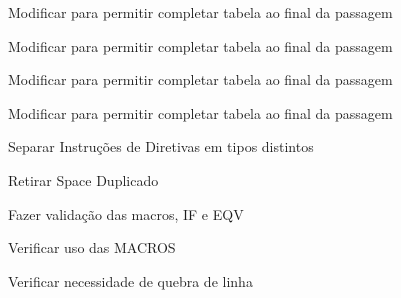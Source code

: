 
\begin{DoxyRefList}
\item[\label{todo__todo000001}%
\hypertarget{todo__todo000001}{}%
Membro \hyperlink{assembler_8cpp_a45dcd38a718d16b9fdcda1e45c4ad5de}{add\-New\-Symbol\-I\-N\-S\-T1} (string str\-Inst1, string str\-Arg1, int line\-Count, string line)]Modificar para permitir completar tabela ao final da passagem  
\item[\label{todo__todo000002}%
\hypertarget{todo__todo000002}{}%
Membro \hyperlink{assembler_8cpp_ad85cc701dcbc6e69b1c273a99c2262d8}{add\-New\-Symbol\-I\-N\-S\-T1\-P\-L\-U\-S} (string str\-Inst1, string str\-Arg1, int num\-Arg1\-Plus, int line\-Count, string line)]Modificar para permitir completar tabela ao final da passagem  
\item[\label{todo__todo000003}%
\hypertarget{todo__todo000003}{}%
Membro \hyperlink{assembler_8cpp_a4b08bb4206172aa8ae36e47f8298e274}{add\-New\-Symbol\-I\-N\-S\-T2} (string str\-Inst2, string str\-Arg1, string str\-Arg2, int line\-Count, string line)]Modificar para permitir completar tabela ao final da passagem 

Modificar para permitir completar tabela ao final da passagem  
\item[\label{todo__todo000005}%
\hypertarget{todo__todo000005}{}%
Membro \hyperlink{languagedefinition_8h_a1830ff5737e4f1610e975ee2aa489206}{Instruction\-Code} ]Separar Instruções de Diretivas em tipos distintos 

Retirar Space Duplicado  
\item[\label{todo__todo000006}%
\hypertarget{todo__todo000006}{}%
Membro \hyperlink{macroeval_8h_ab726e2a9f26698bddb5ddd13683e6630}{macroeval} (int argc, char $\ast$$\ast$argv)]Fazer validação das macros, I\-F e E\-Q\-V 

Verificar uso das M\-A\-C\-R\-O\-S 

Verificar necessidade de quebra de linha 
\end{DoxyRefList}